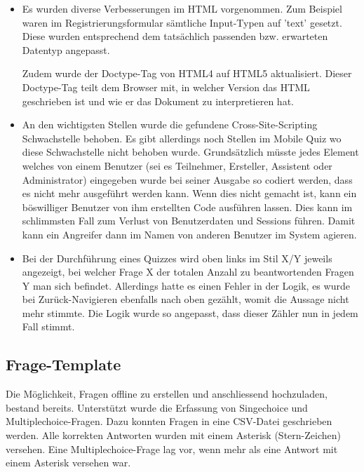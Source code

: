 \begin{itemize}
	\item Es wurden diverse Verbesserungen im HTML vorgenommen. Zum Beispiel waren im Registrierungsformular sämtliche Input-Typen auf 'text' gesetzt. Diese wurden entsprechend dem tatsächlich passenden bzw. erwarteten Datentyp angepasst.
	
	Zudem wurde der Doctype-Tag von HTML4 auf HTML5 aktualisiert. Dieser Doctype-Tag teilt dem Browser mit, in welcher Version das HTML geschrieben ist und wie er das Dokument zu interpretieren hat.
	
	\item An den wichtigsten Stellen wurde die gefundene \gls{Cross-Site-Scripting} Schwachstelle behoben. Es gibt allerdings noch Stellen im Mobile Quiz wo diese Schwachstelle nicht behoben wurde. Grundsätzlich müsste jedes Element welches von einem Benutzer (sei es Teilnehmer, Ersteller, Assistent oder Administrator) eingegeben wurde bei seiner Ausgabe so codiert werden, dass es nicht mehr ausgeführt werden kann. Wenn dies nicht gemacht ist, kann ein böswilliger Benutzer von ihm erstellten Code ausführen lassen. Dies kann im schlimmsten Fall zum Verlust von Benutzerdaten und Sessions führen. Damit kann ein Angreifer dann im Namen von anderen Benutzer im System agieren.
	
	\item Bei der Durchführung eines Quizzes wird oben links im Stil X/Y jeweils angezeigt, bei welcher Frage X der totalen Anzahl zu beantwortenden Fragen Y man sich befindet. Allerdings hatte es einen Fehler in der Logik, es wurde bei Zurück-Navigieren ebenfalls nach oben gezählt, womit die Aussage nicht mehr stimmte.
	Die Logik wurde so angepasst, dass dieser Zähler nun in jedem Fall stimmt. 
	
\end{itemize}


\subsection{Frage-Template}

\label{subsec:FrageTemplate}
Die Möglichkeit, Fragen offline zu erstellen und anschliessend hochzuladen, bestand bereits. Unterstützt wurde die Erfassung von Singechoice und Multiplechoice-Fragen. Dazu konnten Fragen in eine CSV-Datei geschrieben werden. Alle korrekten Antworten wurden mit einem Asterisk (Stern-Zeichen) versehen. Eine Multiplechoice-Frage lag vor, wenn mehr als eine Antwort mit einem Asterisk versehen war.

